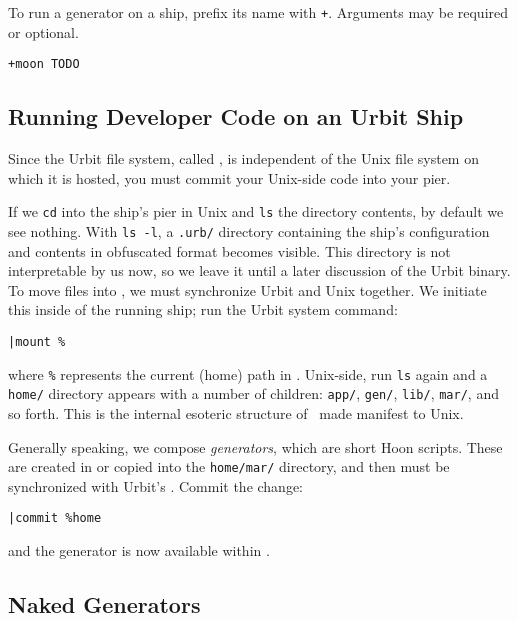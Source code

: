 To run a generator on a ship, prefix its name with \texttt{+}.  Arguments may be required or optional.

\begin{lstlisting}[style=nonumbers]
+moon TODO
\end{lstlisting}

\subsection{Running Developer Code on an Urbit Ship}

Since the Urbit file system, called \clay, is independent of the Unix file system on which it is hosted, you must commit your Unix-side code into your pier.

If we \texttt{cd} into the ship's pier in Unix and \texttt{ls} the directory contents, by default we see nothing.  With \texttt{ls -l}, a \texttt{.urb/} directory containing the ship's configuration and contents in obfuscated format becomes visible.  This directory is not interpretable by us now, so we leave it until a later discussion of the Urbit binary.  To move files into \clay, we must synchronize Urbit and Unix together.  We initiate this inside of the running ship; run the Urbit system command:

\begin{lstlisting}[style=nonumbers]
|mount %
\end{lstlisting}

where \texttt{\%} represents the current (home) path in \clay.  Unix-side, run \texttt{ls} again and a \texttt{home/} directory appears with a number of children:  \texttt{app/}, \texttt{gen/}, \texttt{lib/}, \texttt{mar/}, and so forth.  This is the internal esoteric structure of \clay~made manifest to Unix.

Generally speaking, we compose \emph{generators}, which are short Hoon scripts.  These are created in or copied into the \texttt{home/mar/} directory, and then must be synchronized with Urbit's \clay.  Commit the change:

\begin{lstlisting}[style=nonumbers]
|commit %home
\end{lstlisting}

and the generator is now available within \clay.

\subsection{Naked Generators}


